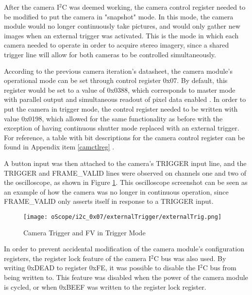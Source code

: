 \par
After the camera I$^2$C was deemed working, the camera control register needed to be modified to put the camera in "snapshot" mode. In this mode, the camera module would no longer continuously take pictures, and would only gather new images when an external trigger was activated. This is the mode in which each camera needed to operate in order to acquire stereo imagery, since a shared trigger line will allow for both cameras to be controlled simultaneously.
\par
According to the previous camera iteration's datasheet, the camera module's operational mode can be set through control register 0x07. By default, this register would be set to a value of 0x0388, which corresponds to master mode with parallel output and simultaneous readout of pixel data enabled \cite{mt9v032}. In order to put the camera in trigger mode, the control register needed to be written with value 0x0198, which allowed for the same functionality as before with the exception of having continuous shutter mode replaced with an external trigger. For reference, a table with bit descriptions for the camera control register can be found in Appendix item \ref{camctlreg} \cite{mt9v032}.
\par
A button input was then attached to the camera's TRIGGER input line, and the TRIGGER and FRAME\_VALID lines were observed on channels one and two of the oscilloscope, as shown in Figure \ref{camInTrigMode}. This oscilloscope screenshot can be seen as an example of how the camera was no longer in continuous operation, since FRAME\_VALID only asserts itself in response to a TRIGGER input. 
\begin{figure}[H]
	\centerline{\texttt{[image: oScope/i2c\_0x07/externalTrigger/externalTrig.png]}}
	\caption{Camera Trigger and FV in Trigger Mode}
	\label{camInTrigMode}
\end{figure}
\par
In order to prevent accidental modification of the camera module's configuration registers, the register lock feature of the camera I$^2$C bus was also used. By writing 0xDEAD to register 0xFE, it was possible to disable the I$^2$C bus from being written to. This feature was disabled when the power of the camera module is cycled, or when 0xBEEF was written to the register lock register.
